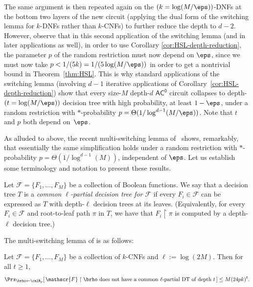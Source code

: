 \documentclass{toc}
\theoremstyle{plain}
\newcommand{\acz}{\mathsf{AC^0}}
\newcommand{\uhr}{\upharpoonright}
\begin{document}
The same argument is then repeated again on the $(k= \log(M/\eps))$-DNFs at the bottom two layers of the new circuit (applying the dual form of the switching lemma for $k$-DNFs rather than $k$-CNFs) to further reduce the depth to $d-2$.  However, observe that in this second application of the switching lemma (and in later applications as well), in order to use Corollary \ref{cor:HSL-depth-reduction}, the parameter $p$ of the random restriction must now depend on $\eps$, since we must now take $p < 1/({5k}) =  1/(5\log(M/\eps))$ in order to get a nontrivial bound in Theorem~\ref{thm:HSL}. This is why standard applications of the~\cite{Hastad86} switching lemma (involving $d-1$ iterative applications of Corollary~\ref{cor:HSL-depth-reduction}) show that every size-$M$ depth-$d$ $\acz$ circuit collapses to depth-$(t = \log(M/\eps))$ decision tree with high probability, at least $1-\eps$, under a random restriction with $\ast$-probability $p = \Theta(1/\log^{d-1}(M/\eps))$. Note that $t$ and $p$ both depend on~$\eps$.

As alluded to above, the recent multi-switching lemma of~\cite{Has14} shows, remarkably, that essentially the same simplification holds under a random restriction with $\ast$-probability $p = \Theta(1/\log^{d-1}(M))$, independent of $\eps$. Let us establish some terminology and notation to present these results.

\begin{definition} 
Let $\mathscr{F} = \{F_1,\ldots,F_M\}$ be a collection of Boolean functions. We say that a decision tree $T$ is a \emph{common $\ell$-partial decision tree for $\mathscr{F}$} if every $F_i \in \mathscr{F}$ can be expressed as $T$ with depth-$\ell$ decision trees at its leaves. (Equivalently, for every $F_i \in \mathscr{F}$ and root-to-leaf path $\pi$ in $T$, we have that $F_i \uhr \pi$ is computed by a depth-$\ell$ decision tree.)  
\end{definition} 


The multi-switching lemma of \cite{Has14} is as follows:

\begin{theorem}
\label{thm:HSL14}
Let $\mathscr{F} = \{F_1,\ldots,F_M\}$ be a collection of $k$-CNFs and $\ell := \log(2M)$. Then for all $t \ge 1$, 
\[ \Prx_{\brho\leftarrow\calR_p}[\, \mathscr{F}\uhr\brho \text{~does not have a common $\ell$-partial DT of depth $t$}\,] \le M(24pk)^t.  \] 
\end{theorem}
\end{document}
